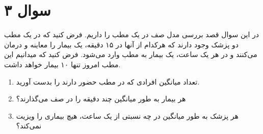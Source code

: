 \section*{سوال ۳}

در این سوال قصد بررسی مدل صف در یک مطب را داریم. فرض کنید که در یک مطب دو پزشک وجود دارند که هرکدام از آنها در ۱۵ دقیقه، یک بیمار را معاینه و درمان می‌کنند و در هر یک ساعت، یک بیمار به مطب وارد می‌شود. فرض کنید که میدانیم این مطب امروز تنها ۱۰ بیمار خواهد داشت.

\begin{enumerate}
	\item تعداد میانگین افرادی که در مطب حضور دارند را بدست آورید.
	\item هر بیمار به طور میانگین چند دقیقه را در صف می‌گذارند؟
	\item هر پزشک به طور میانگین در چه نسبتی از یک ساعت، هیچ بیماری را ویزیت نمی‌کند؟
\end{enumerate}